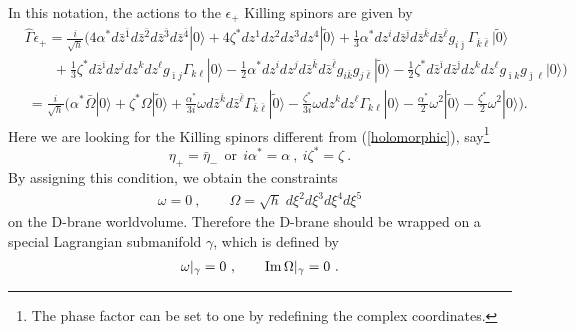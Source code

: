 \documentclass[a4paper,12pt]{article}
\numberwithin{equation}{section}
\newcommand{\ib}{\bar{\imath}}
\newcommand{\jb}{\bar{\jmath}}
\newcommand{\kb}{\bar{k}}
\newcommand{\lb}{\bar{\ell}}
\newcommand{\zb}{\bar{z}}
\newcommand{\Omegab}{\bar{\Omega}}
\newcommand{\vac}{|0\rangle}
\newcommand{\vact}{|\tilde 0\rangle}
\DeclareMathOperator*{\im}{{\rm Im}}
\newcommand{\nn}{\nonumber\\}
\newcommand{\etb}{\bar{\eta}}
\begin{document}
In this notation, the actions to the $\epsilon_+$ Killing spinors are
given by
\begin{align}
 &\hat{\Gamma} \epsilon_{+}=\frac{i}{\sqrt{h}} \Bigg(
     4\alpha^* d\zb^{\bar 1}d\zb^{\bar 2}d\zb^{\bar 3}d\zb^{\bar 4}\vac
    +4\zeta^* dz^{1}dz^{2}dz^{3}dz^{4}\vact 
     +\frac13\alpha^*dz^{i}d\zb^{\jb}d\zb^{\kb}d\zb^{\lb}g_{i\jb}
                                                     \Gamma_{\kb\lb}\vact
   \nn & \qquad
   +\frac13\zeta^*d\zb^{\ib}dz^{j}dz^{k}dz^{\ell}g_{\ib j}
                                                     \Gamma_{k \ell}\vac 
     -\frac12 \alpha^{*}
    dz^{i}dz^{j}d\zb^{\kb}d\zb^{\lb}g_{i\kb}g_{j\lb}\vact
      -\frac12 \zeta^{*}d\zb^{\ib}d\zb^{\jb}    
                        dz^{k}dz^{\ell}g_{\ib k}g_{\jb \ell}\vac
  \Bigg)\nn
  & ~ =\frac{i}{\sqrt{h}} \Bigg(
     \alpha^* \Omegab\vac + \zeta^* \Omega\vact 
     +\frac{\alpha^*}{3i}\omega d\zb^{\kb}d\zb^{\lb} \Gamma_{\kb\lb}\vact
-\frac{\zeta^*}{3i}\omega dz^{k}dz^{\ell}       
     \Gamma_{k \ell}\vac
     -\frac{\alpha^{*}}{2}\omega^2\vact-\frac{\zeta^{*}}{2}\omega^2\vac
  \Bigg) .
\end{align}
Here we are looking  for the Killing spinors 
different from (\ref{holomorphic}), say\footnote{
The phase factor can be set to one by redefining the complex coordinates.
}
\begin{equation}
 \eta_{+}=\etb_{-} ~~ \mbox{or} ~~ i\alpha^{*}=\alpha~,\ i\zeta^{*}=\zeta ~.
\end{equation}
By assigning this condition, we obtain the constraints
\begin{eqnarray}
 \omega=0 ~,\qquad \Omega=\sqrt{h}\;
   d\xi^{2}d\xi^{3}d\xi^{4}d\xi^{5}
\end{eqnarray}
on the D-brane worldvolume.
Therefore the D-brane should be wrapped on 
a special Lagrangian submanifold $\gamma$, which is defined by
\begin{eqnarray}
 \omega|_{\gamma}=0~,\qquad \im \Omega|_{\gamma}=0 ~.
\label{SL} 
\end{eqnarray}
\end{document}
